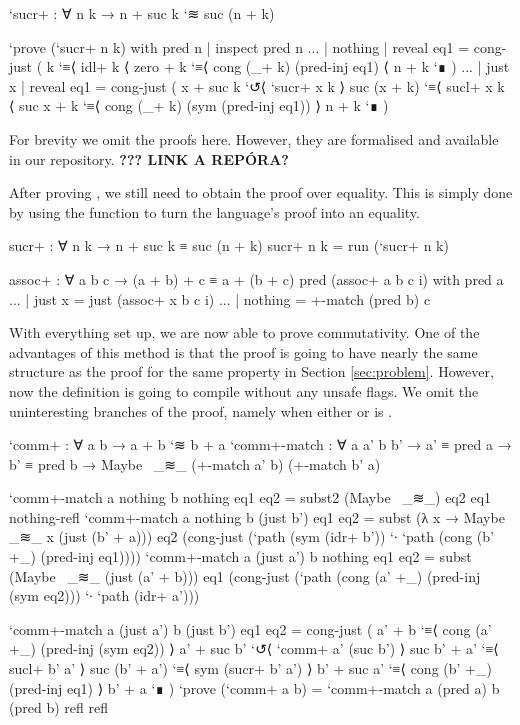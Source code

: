 \begin{code}
`sucr+ : ∀ n k → n + suc k `≋ suc (n + k)
\end{code}
\begin{code}[hide]
`prove (`sucr+ n k) with pred n | inspect pred n
... | nothing | reveal eq1 = cong-just (
  k
    `≡⟨ idl+ k ⟨
  zero + k
    `≡⟨ cong (_+ k) (pred-inj eq1) ⟨
  n + k `∎
  )
... | just x  | reveal eq1 = cong-just (
  x + suc k
    `↺⟨ `sucr+ x k ⟩
  suc (x + k)
    `≡⟨ sucl+ x k ⟨
  suc x + k
    `≡⟨ cong (_+ k) (sym (pred-inj eq1)) ⟩
  n + k `∎
  )
\end{code}

For brevity we omit the proofs here. However, they are formalised and available in our repository.
\textbf{??? LINK A REPÓRA?}

After proving , we still need to obtain the proof over equality.
This is simply done by using the  function to turn the language's proof
into an equality.

\begin{code}
sucr+ : ∀ n k → n + suc k ≡ suc (n + k)
sucr+ n k = run (`sucr+ n k)
\end{code}
\begin{code}[hide]
assoc+ : ∀ a b c → (a + b) + c ≡ a + (b + c)
pred (assoc+ a b c i) with pred a
... | just x = just (assoc+ x b c i)
... | nothing = +-match (pred b) c
\end{code}

With everything set up, we are now able to prove commutativity. One of the advantages
of this method is that the proof is going to have nearly the same structure as the proof
for the same property in Section \ref{sec:problem}. However, now the definition is going to
compile without any unsafe flags. We omit the uninteresting branches of the proof, namely when either
 or  is .

\begin{code}
`comm+ : ∀ a b → a + b `≋ b + a
`comm+-match : ∀ a a' b b' → a' ≡ pred a → b' ≡ pred b → Maybe~ _≋_ (+-match a' b) (+-match b' a)
\end{code}
\begin{code}[hide]
`comm+-match a nothing b nothing eq1 eq2 = subst2 (Maybe~ _≋_) eq2 eq1 nothing-refl
`comm+-match a nothing b (just b') eq1 eq2 = subst (λ x → Maybe~ _≋_ x (just (b' + a))) eq2 (cong-just (`path (sym (idr+ b')) `∙ `path (cong (b' +_) (pred-inj eq1))))
`comm+-match a (just a') b nothing eq1 eq2 = subst (Maybe~ _≋_ (just (a' + b))) eq1 (cong-just (`path (cong (a' +_) (pred-inj (sym eq2))) `∙ `path (idr+ a')))
\end{code}
\begin{code}
`comm+-match a (just a') b (just b') eq1 eq2 = cong-just (
  a' + b
    `≡⟨ cong (a' +_) (pred-inj (sym eq2)) ⟩
  a' + suc b'
    `↺⟨ `comm+ a' (suc b') ⟩
  suc b' + a'
    `≡⟨ sucl+ b' a' ⟩
  suc (b' + a')
    `≡⟨ sym (sucr+ b' a') ⟩
  b' + suc a'
    `≡⟨ cong (b' +_) (pred-inj eq1) ⟩
  b' + a `∎
  )
`prove (`comm+ a b) = `comm+-match a (pred a) b (pred b) refl refl
\end{code}

